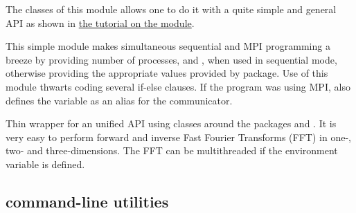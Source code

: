 
The classes of this module allows one to do it with a quite simple and general
API as shown in
\href{http://fluiddyn.readthedocs.io/en/latest/ipynb/tuto_serieofarrays.html}{%
the tutorial on the module}.


This simple module makes simultaneous sequential and MPI programming a breeze
by providing number of processes,  and , when used in sequential mode, otherwise providing the appropriate values
provided by  package. Use of this module thwarts coding several if-else
clauses. If the program was using MPI, also defines the variable
 as an alias for the  communicator.


Thin wrapper for an unified API using classes around the packages 
and .  It is very easy to perform forward and inverse Fast
Fourier Transforms (FFT) in one-, two- and three-dimensions.
The FFT can be multithreaded if the environment variable
 is defined.

\subsection{\fluiddyn command-line utilities}

